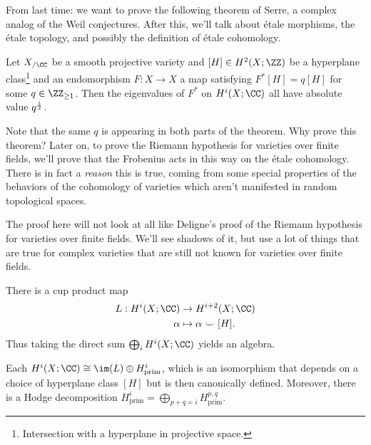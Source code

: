 From last time: we want to prove the following theorem of Serre, a
complex analog of the Weil conjectures. After this, we'll talk about
étale morphisms, the étale topology, and possibly the definition of
étale cohomology.

\begin{theorem}[Serre]

Let \(X_{/\CC}\) be a smooth projective variety and
\([H]\in H^2(X; \ZZ)\) be a hyperplane class\footnote{Intersection with
  a hyperplane in projective space.} and an endomorphism \(F:X\to X\) a
map satisfying \(F^*[H] = q[H]\) for some \(q\in \ZZ_{\geq 1}\). Then
the eigenvalues of \(F^*\) on \(H^i(X;\CC)\) all have absolute value
\(q^{i\over 2}\).

\end{theorem}

Note that the same \(q\) is appearing in both parts of the theorem. Why
prove this theorem? Later on, to prove the Riemann hypothesis for
varieties over finite fields, we'll prove that the Frobenius acts in
this way on the étale cohomology. There is in fact a \emph{reason} this
is true, coming from some special properties of the behaviors of the
cohomology of varieties which aren't manifested in random topological
spaces.

\begin{warnings}

The proof here will not look at all like Deligne's proof of the Riemann
hypothesis for varieties over finite fields. We'll see shadows of it,
but use a lot of things that are true for complex varieties that are
still not known for varieties over finite fields.

\end{warnings}

\begin{fact}

There is a cup product map
\begin{align*}  
L: H^i(X; \CC) &\to H^{i+2}(X; \CC) \\
\alpha &\mapsto \alpha \smile [H]
.\end{align*} Thus taking the direct sum \(\bigoplus_i H^i(X; \CC)\)
yields an algebra.

\end{fact}

\begin{theorem}

Each \(H^i(X; \CC) \cong \im(L) \oplus H^i_{\text{prim}}\), which is an
isomorphism that depends on a choice of hyperplane class \([H]\) but is
then canonically defined. Moreover, there is a Hodge decomposition
\(H^i_{\text{prim}} = \bigoplus_{p+q=i}H^{p, q}_{\text{prim}}\).

\end{theorem}

